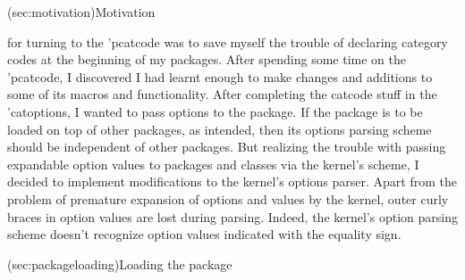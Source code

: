 \documentclass[
  use-a4-paper,
  use-10pt-font,
  final-version,
  use-UK-English,
  fancy-section-headings,
  frame-section-numbers,
  para-abstract-style,
  input-config-file,
  no-hyperref-messages
]{amltxdoc}
\begin{document}
\begin{frontmatter}
\let\licensename\relax
\begin{license}
  \small
{}
\end{license}
\end{frontmatter}

\begin{xwmshade}[fillcolor=white,framecolor=orange,framerule=1pt,framesep=2pt,
  width=1.0\hsize]\tableofcontents
\end{xwmshade}


\docsection(sec:motivation){Motivation}

 for turning to the \pkgg'{pcatcode} was to save myself the trouble of declaring category codes at the beginning of my packages. After spending some time on the \pkgg'{pcatcode}, I discovered I had learnt enough to make changes and additions to some of its macros and functionality. After completing the catcode stuff in the \pkg'{catoptions}, I wanted to pass options to the package. If the package is to be loaded on top of other packages, as intended, then its options parsing scheme should be independent of other packages. But realizing the trouble with passing expandable option values to packages and classes via the \latex kernel's scheme, I decided to implement modifications to the kernel's options parser. Apart from the problem of premature expansion of options and values by the \latex kernel, outer curly braces in option values are lost during parsing. Indeed, the kernel's option parsing scheme doesn't recognize option values indicated with the equality sign.


\docsection(sec:packageloading){Loading the package}
\end{document}
